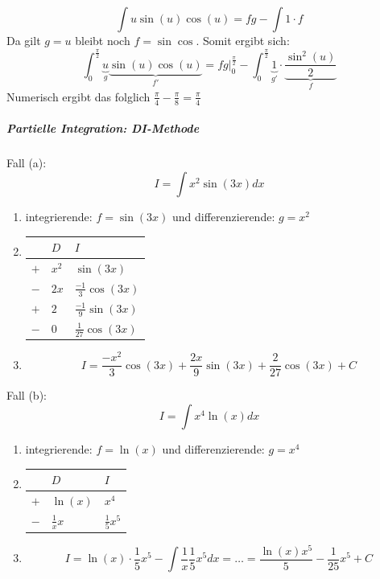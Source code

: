 \documentclass[7pt,landscape, margin = 0.1mm]{article}
\begin{document}
\begin{multicols}{4}
\begin{flushleft}
$$\int u \sin(u) \cos(u) = fg - \int 1 \cdot f $$
Da gilt $ g =u$ bleibt noch $f=\sin \cos$. Somit ergibt sich:
$$ \int_{0}^{\frac{\pi}{2}} \underbrace{u}_{g} \underbrace{\sin(u) \cos(u)}_{f'} = \left. fg \right|_{0}^{\frac{\pi}{2}} -  \int_{0}^{\frac{\pi}{2}} \underbrace{1}_{g'} \cdot \underbrace{\frac{\sin^2(u)}{2}}_{f}  $$
Numerisch ergibt das folglich $\frac{\pi}{4}-\frac{\pi}{8}=\frac{\pi }{4}$
\vspace{1mm} \hline \vspace{1mm}
\subparagraph{Partielle Integration: DI-Methode}

Fall (a):\\
$$I = \int x^2 \sin(3x)dx$$
\begin{enumerate}
\item integrierende: $f=\sin(3x)$ und differenzierende: $g=x^2$
\item 
\begin{center}

\begin{tabular}{l|ll}
    & $D$ & $I$ \\ \hline
$+$   & $x^2$   & $\sin(3x)$   \\
$-$   &  $2x$ &  $\frac{-1}{3}\cos(3x)$ \\ 
$+$   & $2$  &   $\frac{-1}{9} \sin(3x)$ \\ 
$-$   & $0$ &  $\frac{1}{27}  \cos(3x)$ \\ 

\end{tabular}
\end{center}
\item 
$$I = \frac{-x^2}{3}\cos(3x)+ \frac{2x}{9}\sin(3x)+\frac{2}{27}\cos(3x)+C$$
\end{enumerate}
Fall (b):\\
$$I = \int x^4 \ln(x)dx$$
\begin{enumerate}
\item integrierende: $f=\ln(x)$ und differenzierende: $g=x^4$
\item
\begin{center}
\begin{tabular}{l|ll}
    & $D$ & $I$ \\ \hline
$+$   & $\ln(x)$   & $x^4$   \\
$-$   &  $\frac{1}{x}x$ &  $\frac{1}{5}x^5$ \\ 
 \end{tabular}
\end{center}
\item
$$I= \ln(x)\cdot \frac{1}{5}x^5 - \int \frac{1}{x} \frac{1}{5}x^5 dx = \ldots = \frac{\ln(x) x^5}{5} - \frac{1}{25}x^5 +C$$


\end{enumerate}
\end{flushleft}
\end{multicols}
\end{document}

